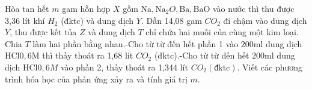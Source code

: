 \begin{vd}
	Hòa tan hết $m$ gam hỗn hợp $X$ gồm $\mathrm{Na}, \mathrm{Na}_2 O, \mathrm{Ba}, \mathrm{BaO}$ vào nước thì thu được 3,36 lít khí $H_2$ (đktc) và dung dịch $Y$. Dẫn 14,08 gam $CO_2$ đi chậm vào dung dịch $Y$, thu được kết tủa $Z$ và dung dịch $T$ chỉ chứa hai muối của cùng một kim loại. Chia $T$ làm hai phần bằng nhau.-Cho từ từ đến hết phần 1 vào $200\mathrm{ml}$ dung dịch $\mathrm{HCl} \mathrm{0,6M}$ thì thấy thoát ra 1,68 lít $CO_2$ (đktc).-Cho từ từ đến hết $200\mathrm{ml}$ dung dịch $\mathrm{HCl} 0,6M$ vào phần 2, thấy thoát ra 1,344 lít $CO_2(\mathrm{đktc})$.
	Viết các phương trình hóa học của phản ứng xảy ra và tính giá trị $m$.
	\loigiai{
}
\end{vd}

